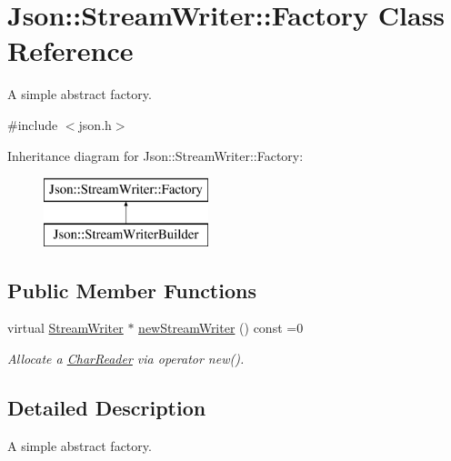 \hypertarget{class_json_1_1_stream_writer_1_1_factory}{\section{Json\-:\-:Stream\-Writer\-:\-:Factory Class Reference}
\label{class_json_1_1_stream_writer_1_1_factory}
}


A simple abstract factory.  




{\ttfamily \#include $<$json.\-h$>$}

Inheritance diagram for Json\-:\-:Stream\-Writer\-:\-:Factory\-:\begin{figure}[H]
\begin{center}
\leavevmode
\includegraphics[height=2.000000cm]{class_json_1_1_stream_writer_1_1_factory}
\end{center}
\end{figure}
\subsection*{Public Member Functions}
\begin{DoxyCompactItemize}
\item 
virtual \hyperlink{class_json_1_1_stream_writer}{Stream\-Writer} $\ast$ \hyperlink{class_json_1_1_stream_writer_1_1_factory_a9d30ec53e8288cd53befccf1009c5f31}{new\-Stream\-Writer} () const =0
\begin{DoxyCompactList}\small\item\em Allocate a \hyperlink{class_json_1_1_char_reader}{Char\-Reader} via operator new(). \end{DoxyCompactList}\end{DoxyCompactItemize}


\subsection{Detailed Description}
A simple abstract factory. 


